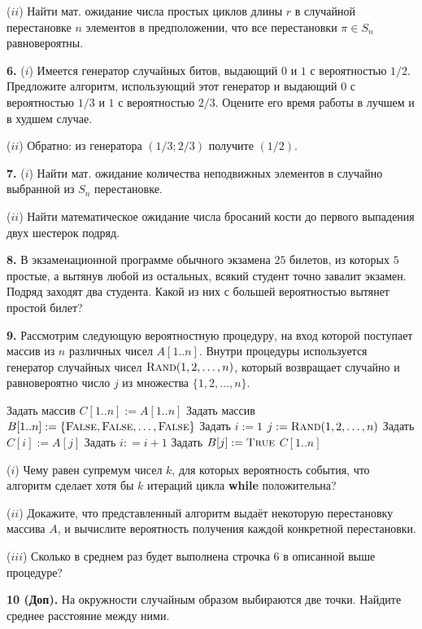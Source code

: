 \documentclass[12pt,a5paper,fleqn]{article}
\begin{document}
($ii$) Найти мат. ожидание числа простых циклов длины $r$ в случайной перестановке $n$ элементов в предположении, что все перестановки $\pi \in S_n$ равновероятны.

\smallskip

{\bf 6.} ($i$) Имеется генератор случайных битов, выдающий $0$ и $1$ с вероятностью $1/2$. Предложите алгоритм, использующий этот генератор и выдающий $0$ с вероятностью $1/3$ и $1$ с вероятностью $2/3$. Оцените его время работы в лучшем и в худшем случае.

($ii$) Обратно: из генератора $(1/3; 2/3)$ получите $(1/2)$.

\smallskip

{\bf 7.} ($i$) Найти мат. ожидание количества неподвижных элементов в случайно выбранной из $S_n$ перестановке.   

($ii$) Найти математическое ожидание числа бросаний кости до первого выпадения двух шестерок подряд. 

\smallskip

{\bf 8.} В экзаменационной программе обычного экзамена $25$ билетов, из которых $5$ простые, а вытянув любой из остальных, всякий студент точно завалит экзамен. Подряд заходят два студента. Какой из них с большей вероятностью вытянет простой билет?

\smallskip

{\bf 9.} Рассмотрим следующую вероятностную процедуру, на вход которой поступает массив из $n$ различных чисел $A[1..n]$. Внутри процедуры используется генератор случайных чисел $\textsc{Rand}(1,2,\ldots,n)$, который возвращает случайно и равновероятно число $j$ из множества $\{1,2,\ldots,n\}$.

\begin{algorithmic}[1]
    \State Задать массив $C[1..n] := A[1..n]$
    \State Задать массив $B[1..n] := \{\textsc{False},\textsc{False},\ldots,\textsc{False}\}$
    \State Задать $i := 1$
    \State $j := \textsc{Rand}(1,2,\ldots,n)$
    \State Задать $C[i] := A[j]$
    \State Задать $i : = i+1$
    \State Задать $B[j] := \textsc{True}$
    \EndIf
    \EndWhile
    \State \Return $C[1..n]$
    \EndProcedure
\end{algorithmic}

\medskip

($i$) Чему равен супремум чисел $k$, для которых вероятность события, что алгоритм сделает хотя бы $k$ итераций цикла {\bf while} положительна?  
 
($ii$) Докажите, что представленный алгоритм выдаёт некоторую перестановку массива $A$, и вычислите вероятность получения каждой конкретной перестановки.

($iii$) Сколько в среднем раз будет выполнена строчка $6$ в описанной выше процедуре?

\smallskip

{\bf 10 (Доп).}  На окружности случайным образом выбираются две точки. Найдите среднее расстояние между ними.
\end{document}
